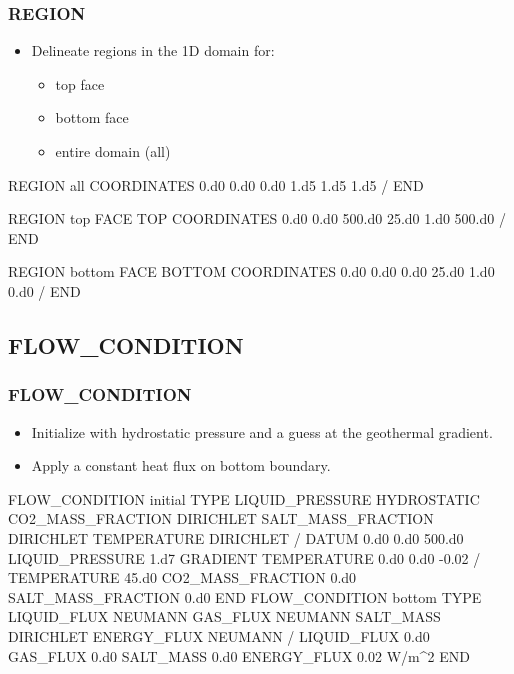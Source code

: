 \documentclass{beamer}
\begin{document}
\begin{frame}\frametitle{REGION}

\begin{itemize}
  \item Delineate regions in the 1D domain for:
  \begin{itemize}
    \item top face
    \item bottom face
    \item entire domain (all)
  \end{itemize}
\end{itemize}

\begin{semiverbatim}
REGION all
  COORDINATES
    0.d0 0.d0 0.d0
    1.d5 1.d5 1.d5
  /
END

\newpage
REGION top
  FACE TOP
  COORDINATES
    0.d0 0.d0  500.d0
    25.d0 1.d0 500.d0
  /
END

REGION bottom
  FACE BOTTOM
  COORDINATES
    0.d0 0.d0  0.d0
    25.d0 1.d0 0.d0
  /
END

\end{semiverbatim}

\end{frame}

\subsection{FLOW\_CONDITION}

\begin{frame}\frametitle{FLOW\_CONDITION}

\begin{itemize}
\item Initialize with hydrostatic pressure and a guess at the geothermal gradient.
\item Apply a constant heat flux on bottom boundary.
\end{itemize}

\newpage
\begin{semiverbatim}
FLOW_CONDITION initial
  TYPE
    LIQUID_PRESSURE HYDROSTATIC
    CO2_MASS_FRACTION DIRICHLET
    SALT_MASS_FRACTION DIRICHLET
    TEMPERATURE DIRICHLET
  /
  DATUM 0.d0 0.d0 500.d0
  LIQUID_PRESSURE 1.d7
  GRADIENT
    TEMPERATURE 0.d0 0.d0 -0.02
  /
  TEMPERATURE 45.d0
  CO2_MASS_FRACTION 0.d0
  SALT_MASS_FRACTION 0.d0
END
\newpage
FLOW_CONDITION bottom
  TYPE
    LIQUID_FLUX NEUMANN
    GAS_FLUX NEUMANN
    SALT_MASS DIRICHLET
    ENERGY_FLUX NEUMANN
  /
  LIQUID_FLUX 0.d0
  GAS_FLUX 0.d0
  SALT_MASS 0.d0
  ENERGY_FLUX 0.02 W/m^2
END

\end{semiverbatim}

\end{frame}
\end{document}
